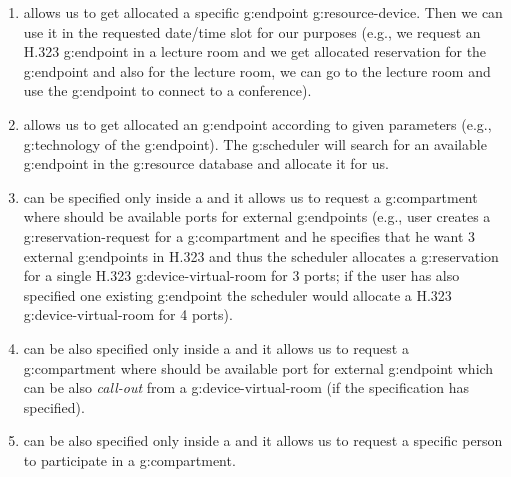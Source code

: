 \begin{enumerate}
\item {} allows us to get allocated a specific \gls{g:endpoint} \gls{g:resource-device}. Then we can use it in the requested date/time slot for our purposes (e.g., we request an H.323 \gls{g:endpoint} in a lecture room and we get allocated reservation for the \gls{g:endpoint} and also for the lecture room, we can go to the lecture room and use the \gls{g:endpoint} to connect to a conference).

\item {} allows us to get allocated an \gls{g:endpoint} according to given parameters (e.g., \gls{g:technology} of the \gls{g:endpoint}). The \gls{g:scheduler} will search for an available \gls{g:endpoint} in the \gls{g:resource} database and allocate it for us.

\item {} can be specified only inside a  and it allows us to request a \gls{g:compartment} where should be available ports for external \glspl{g:endpoint} (e.g., user creates a \gls{g:reservation-request} for a \gls{g:compartment} and he specifies that he want 3 external \glspl{g:endpoint} in H.323 and thus the scheduler allocates a \gls{g:reservation} for a single H.323 \gls{g:device-virtual-room} for 3 ports; if the user has also specified one existing \gls{g:endpoint} the scheduler would allocate a H.323 \gls{g:device-virtual-room} for 4 ports).

\item {} can be also specified only inside a  and it allows us to request a \gls{g:compartment} where should be available port for external \gls{g:endpoint} which can be also \emph{call-out} from a \gls{g:device-virtual-room} (if the specification has  specified).

\item {} can be also specified only inside a  and it allows us to request a specific person to participate in a \gls{g:compartment}.

\end{enumerate}

